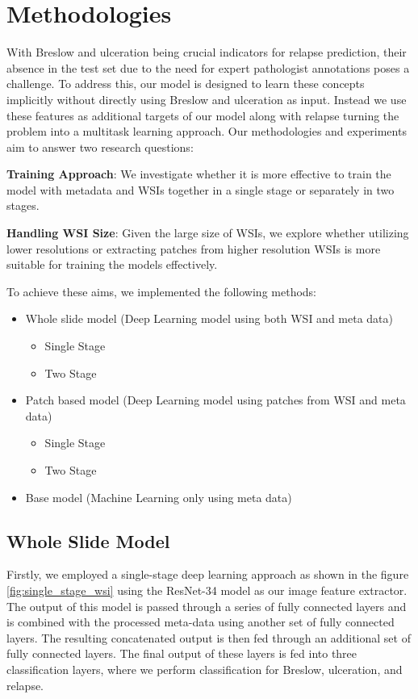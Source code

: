 \documentclass[conference]{IEEEtran}
\begin{document}
\section{Methodologies}
With Breslow and ulceration being crucial indicators for relapse prediction, their absence in the test set due to the need for expert pathologist annotations poses a challenge. To address this, our model is designed to learn these concepts implicitly without directly using Breslow and ulceration as input. Instead we use these features as additional targets of our model along with relapse turning the problem into a multitask learning approach. Our methodologies and experiments aim to answer two research questions:

\textbf{Training Approach}: We investigate whether it is more effective to train the model with metadata and WSIs together in a single stage or separately in two stages.

\textbf{Handling WSI Size}: Given the large size of WSIs, we explore whether utilizing lower resolutions or extracting patches from higher resolution WSIs is more suitable for training the models effectively.

To achieve these aims, we implemented the following methods: 

\begin{itemize}
    \item Whole slide model (Deep Learning model using both WSI and meta data)
    \begin{itemize}
        \item Single Stage
        \item Two Stage
    \end{itemize}
    \item Patch based model (Deep Learning model using patches from WSI and meta data)
    \begin{itemize}
        \item Single Stage
        \item Two Stage
    \end{itemize} 
    \item Base model (Machine Learning only using meta data)
\end{itemize}


\subsection{Whole Slide Model}

Firstly, we employed a single-stage deep learning approach as shown in the figure \ref{fig:single_stage_wsi}  using the ResNet-34 \cite{b5} model as our image feature extractor. The output of this model is passed through a series of fully connected layers and is combined with the processed meta-data using another set of fully connected layers. The resulting concatenated output is then fed through an additional set of fully connected layers. The final output of these layers is fed into three classification layers, where we perform classification for Breslow, ulceration, and relapse.
\end{document}
